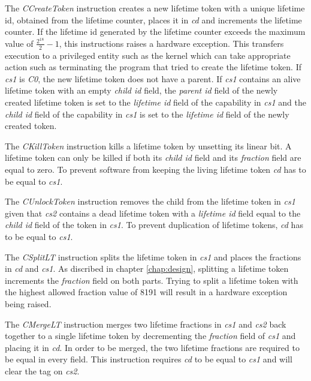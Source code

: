 The \textit{CCreateToken} instruction creates a new lifetime token with a unique lifetime id, obtained from the lifetime counter, places it in \textit{cd} and increments the lifetime counter. If the lifetime id generated by the lifetime counter exceeds the maximum value of $\frac{2^{18}}{2} - 1$, this instructions raises a hardware exception. This transfers execution to a privileged entity such as the kernel which can take appropriate action such as terminating the program that tried to create the lifetime token. If \textit{cs1} is \textit{C0}, the new lifetime token does not have a parent. If \textit{cs1} contains an alive lifetime token with an empty \textit{child id} field, the \textit{parent id} field of the newly created lifetime token is set to the \textit{lifetime id} field of the capability in \textit{cs1} and the \textit{child id} field of the capability in \textit{cs1} is set to the \textit{lifetime id} field of the newly created token.

The \textit{CKillToken} instruction kills a lifetime token by unsetting its linear bit. A lifetime token can only be killed if both its \textit{child id} field and its \textit{fraction} field are equal to zero. To prevent software from keeping the living lifetime token \textit{cd} has to be equal to \textit{cs1}.

The \textit{CUnlockToken} instruction removes the child from the lifetime token in \textit{cs1} given that \textit{cs2} contains a dead lifetime token with a \textit{lifetime id} field equal to the \textit{child id} field of the token in \textit{cs1}. To prevent duplication of lifetime tokens, \textit{cd} has to be equal to \textit{cs1}.

The \textit{CSplitLT} instruction splits the lifetime token in \textit{cs1} and places the fractions in \textit{cd} and \textit{cs1}. As discribed in chapter \ref{chap:design}, splitting a lifetime token increments the \textit{fraction} field on both parts. Trying to split a lifetime token with the highest allowed fraction value of 8191 will result in a hardware exception being raised.

The \textit{CMergeLT} instruction merges two lifetime fractions in \textit{cs1} and \textit{cs2} back together to a single lifetime token by decrementing the \textit{fraction} field of \textit{cs1} and placing it in \textit{cd}. In order to be merged, the two lifetime fractions are required to be equal in every field. This instruction requires \textit{cd} to be equal to \textit{cs1} and will clear the tag on \textit{cs2}.


